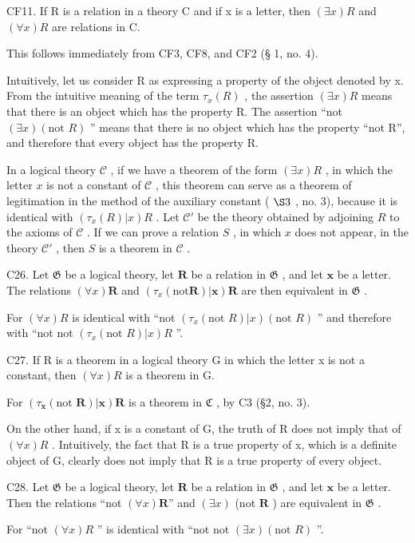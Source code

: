 CF11. If R is a relation in a theory C and if x is a letter, then \((\exists x)R\) and \((\forall x)R\) are relations in C.

This follows immediately from CF3, CF8, and CF2 (§ 1, no. 4).

Intuitively, let us consider R as expressing a property of the object denoted by x. From the intuitive meaning of the term \(\tau_{x}(R)\) , the assertion \((\exists x)R\) means that there is an object which has the property R. The assertion ``not \((\exists x)(\text{not } R)\) '' means that there is no object which has the property ``not R'', and therefore that every object has the property R.

In a logical theory \(\mathcal{C}\) , if we have a theorem of the form \((\exists x)R\) , in which the letter \(x\) is not a constant of \(\mathcal{C}\) , this theorem can serve as a theorem of legitimation in the method of the auxiliary constant ( \(\S 3\) , no. 3), because it is identical with \((\tau_{x}(R)|x)R\) . Let \(\mathcal{C}'\) be the theory obtained by adjoining \(R\) to the axioms of \(\mathcal{C}\) . If we can prove a relation \(S\) , in which \(x\) does not appear, in the theory \(\mathcal{C}'\) , then \(S\) is a theorem in \(\mathcal{C}\) .

C26. Let \(\mathfrak{G}\) be a logical theory, let \(\pmb{R}\) be a relation in \(\mathfrak{G}\) , and let \(\pmb{x}\) be a letter. The relations \((\forall x)\pmb{R}\) and \((\tau_{x}(\mathrm{not}\pmb{R})|\pmb{x})\pmb{R}\) are then equivalent in \(\mathfrak{G}\) .

For \((\forall x)R\) is identical with ``not \((\tau_{x}(\text{not } R)|x)(\text{not } R)\) '' and therefore with ``not not \((\tau_{x}(\text{not } R)|x)R\) ''.

C27. If R is a theorem in a logical theory G in which the letter x is not a constant, then \((\forall x)R\) is a theorem in G.

For \((\tau_{\pmb{x}}(\text{not } \pmb{R})|\pmb{x})\pmb{R}\) is a theorem in \(\mathfrak{C}\) , by C3 (§2, no. 3).

On the other hand, if x is a constant of G, the truth of R does not imply that of \((\forall x)R\) . Intuitively, the fact that R is a true property of x, which is a definite object of G, clearly does not imply that R is a true property of every object.

C28. Let \(\mathfrak{G}\) be a logical theory, let \(\pmb{R}\) be a relation in \(\mathfrak{G}\) , and let \(\pmb{x}\) be a letter. Then the relations ``not \((\forall x)\pmb{R}\)'' and \((\exists x)\) (not \(\pmb{R}\) ) are equivalent in \(\mathfrak{G}\) .

For ``not \((\forall x)R\) '' is identical with ``not not \((\exists x)(\text{not } R)\) ''.

